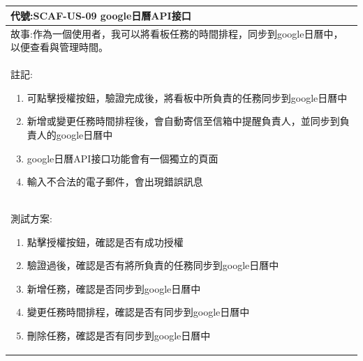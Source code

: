 \documentclass{report}
\begin{document}
\subsection*{}
\fontsize{12}{20}\selectfont
\begin{tabularx}{\textwidth}{|X|}
  \hline
  代號:SCAF-US-09 google日曆API接口 \\
  \hline
  故事:作為一個使用者，我可以將看板任務的時間排程，同步到google日曆中，以便查看與管理時間。 \\
  \hline
  註記:
  \begin{enumerate}
    \item 可點擊授權按鈕，驗證完成後，將看板中所負責的任務同步到google日曆中
    \item 新增或變更任務時間排程後，會自動寄信至信箱中提醒負責人，並同步到負責人的google日曆中
    \item google日曆API接口功能會有一個獨立的頁面
    \item 輸入不合法的電子郵件，會出現錯誤訊息
  \end{enumerate} \\
  \hline
  測試方案:
  \begin{enumerate}
    \item 點擊授權按鈕，確認是否有成功授權
    \item 驗證過後，確認是否有將所負責的任務同步到google日曆中
    \item 新增任務，確認是否同步到google日曆中
    \item 變更任務時間排程，確認是否有同步到google日曆中
    \item 刪除任務，確認是否有同步到google日曆中
  \end{enumerate} \\
  \hline
\end{tabularx}
\end{document}
